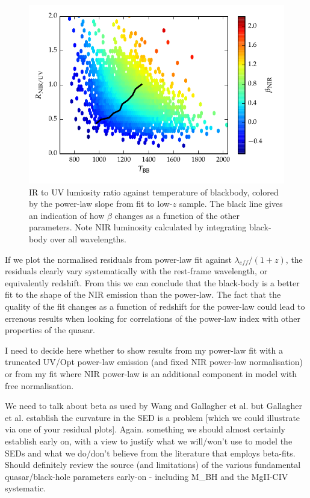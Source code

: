 \begin{figure}
  \centering
  \includegraphics[width=\textwidth]{figures/chapter06/ratio_tbb_beta.pdf}
  \caption{IR to UV lumiosity ratio against temperature of blackbody, colored by the power-law slope from fit to low-$z$ sample. The black line gives an indication of how $\beta$ changes as a function of the other parameters. Note NIR luminosity calculated by integrating black-body over all wavelengths.}
  \label{fig:}
\end{figure}

If we plot the normalised residuals from power-law fit against $\lambda_{eff}/(1+z)$, the residuals clearly vary systematically with the rest-frame wavelength, or equivalently redshift. 
From this we can conclude that the black-body is a better fit to the shape of the NIR emission than the power-law. The fact that the quality of the fit changes as a function of redshift for the power-law could lead to errenous results when looking for correlations of the power-law index with other properties of the quasar. 

I need to decide here whether to show results from my power-law fit with a truncated UV/Opt power-law emission (and fixed NIR power-law normalisation) or from my fit where NIR power-law is an additional component in model with free normalisation.  

We need to talk about beta as used by Wang and Gallagher et al. but Gallagher et al. establish the curvature in the SED is a problem [which we could illustrate via one of your residual plots]. 
Again. something we should almost certainly establish early on, with a view to justify what we will/won't use to model the SEDs and what we do/don't believe from the literature that employs beta-fits.
Should definitely review the source (and limitations) of the various fundamental quasar/black-hole parameters early-on - including M\_BH and the MgII-CIV systematic.

